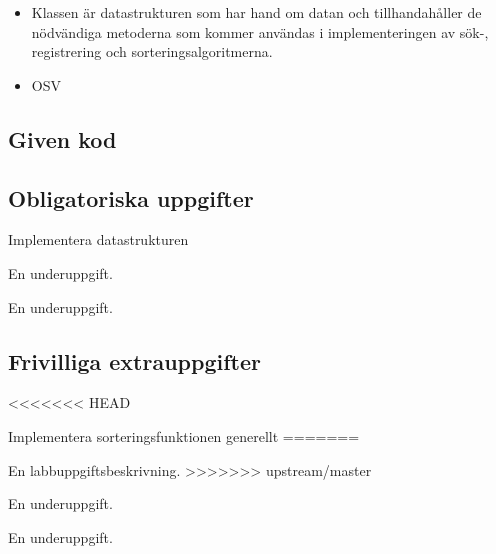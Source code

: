 \begin{itemize}
\item Klassen  är datastrukturen som har hand om datan och tillhandahåller de nödvändiga metoderna som kommer användas i implementeringen av sök-, registrering och sorteringsalgoritmerna.
\item OSV
\end{itemize}

\subsection{Given kod}


\subsection{Obligatoriska uppgifter}

\Task Implementera datastrukturen

\Subtask En underuppgift.

\Subtask En underuppgift.

\subsection{Frivilliga extrauppgifter}
<<<<<<< HEAD

\Task Implementera sorteringsfunktionen generellt
=======
    
\Task En labbuppgiftsbeskrivning.
>>>>>>> upstream/master

\Subtask En underuppgift.

\Subtask En underuppgift.

